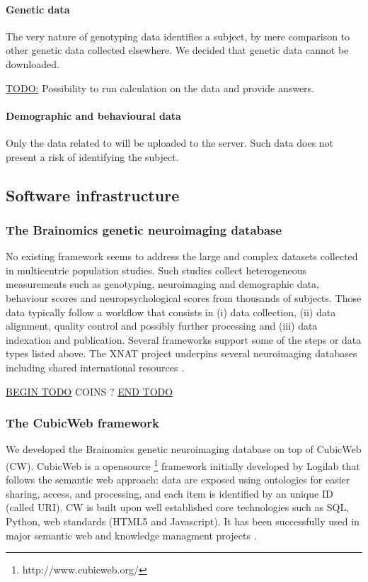 \documentclass[review]{elsarticle}
\begin{document}
\paragraph{Genetic data} The very nature of genotyping data identifies a subject, by mere comparison to other genetic data collected elsewhere. We decided that genetic data cannot be downloaded.

\underline{TODO:} Possibility to run calculation on the data and provide answers.

\paragraph{Demographic and behavioural data} Only the data related to \cite{Pinel2007} will be uploaded to the server. Such data does not present a risk of identifying the subject.


\subsection{Software infrastructure}

\subsubsection{The Brainomics genetic neuroimaging database}

No existing framework seems to address the large and complex datasets collected in multicentric population studies. Such studies collect heterogeneous measurements such as genotyping, neuroimaging and demographic data, behaviour scores and neuropsychological scores from thousands of subjects. Those data typically follow a workflow that consists in (i) data collection, (ii) data alignment, quality control and possibly further processing and (iii) data indexation and publication. Several frameworks support some of the steps or data types listed above. The XNAT project \cite{XNAT2007} underpins several neuroimaging databases including shared international resources \cite{HBP2012}.

\underline{BEGIN TODO}
COINS ?
\underline{END TODO}


\subsubsection{The CubicWeb framework} We developed the Brainomics genetic neuroimaging database on top of CubicWeb (CW). CubicWeb is a opensource \footnote{http://www.cubicweb.org/} framework initially developed by Logilab that follows the semantic web approach: data are exposed using ontologies for easier sharing, access, and processing, and each item is identified by an unique ID (called URI). CW is built upon well established core technologies such as SQL, Python, web standards (HTML5 and Javascript). It has been successfully used in major semantic web and knowledge managment projects \cite{simon}.
\end{document}
